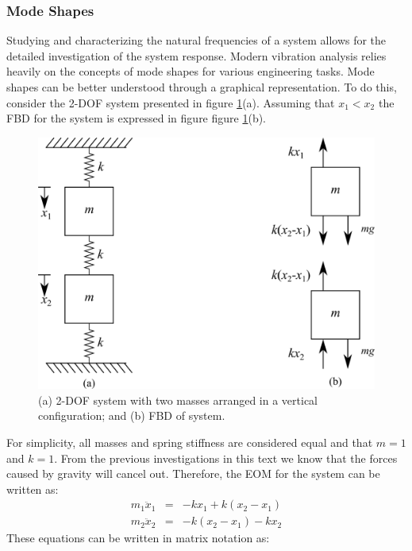 \documentclass[12pt,letter]{article}
\numberwithin{ex}{section} %
\numberwithin{re}{section} %
\begin{document}
\subsubsection{Mode Shapes}
\label{sec:Mode_Shapes}

Studying and characterizing the natural frequencies of a system allows for the detailed investigation of the system response. Modern vibration analysis relies heavily on the concepts of mode shapes for various engineering tasks. Mode shapes can be better understood through a graphical representation. To do this, consider the 2-DOF system presented in figure \ref{fig:2-DOF-spring_mass_vertical}(a). Assuming that $x_1<x_2$ the FBD for the system is expressed in figure figure \ref{fig:2-DOF-spring_mass_vertical}(b).

\begin{figure}[H]
	\centering
	\includegraphics[]{../Figures/2-DOF-spring_mass_vertical_with_FBD.png}
	\caption{(a) 2-DOF system with two masses arranged in a vertical configuration; and (b) FBD of system.}
	\label{fig:2-DOF-spring_mass_vertical}
\end{figure}
\noindent For simplicity, all masses and spring stiffness are considered equal and that $m=1$ and $k=1$. From the previous investigations in this text we know that the forces caused by gravity will cancel out. Therefore, the EOM for the system can be written as:
\begin{eqnarray}
m_1\ddot{x}_1 &= & -kx_1 + k(x_2-x_1) \\
m_2\ddot{x}_2&= & -k(x_2-x_1) -kx_2 \nonumber
\end{eqnarray}
These equations can be written in matrix notation as:
\end{document}
